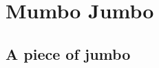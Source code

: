 \chapter{Mumbo Jumbo}\label{Chap:Mumbo}

\section{A piece of jumbo}\label{Sub:Jumbo}



\lipsum[1-23]




